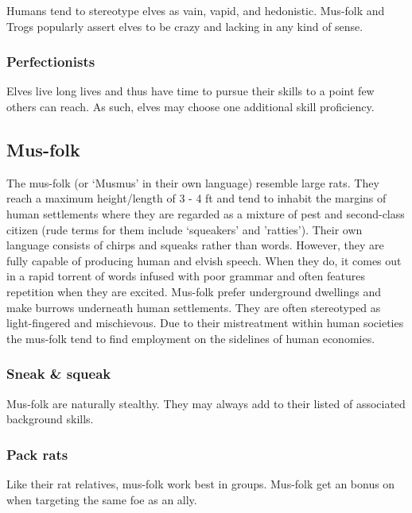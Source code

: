 \documentclass[a4paper,11pt,oneside]{book}
\newcommand{\textlf}[1]{\textbf{\titlecap{#1}}}
\begin{document}
Humans tend to stereotype elves as vain, vapid, and hedonistic. Mus-folk and Trogs popularly assert elves to be crazy and lacking in any kind of sense. 

\subsubsection*{Perfectionists}
Elves live long lives and thus have time to pursue their skills to a point few others can reach. As such, elves may choose one additional skill proficiency.


\subsection{Mus-folk}
The mus-folk (or `Musmus' in their own language) resemble large rats. They reach a maximum height/length of 3 - 4 ft and tend to inhabit the margins of human settlements where they are regarded as a mixture of pest and second-class citizen (rude terms for them include `squeakers' and 'ratties'). Their own language consists of chirps and squeaks rather than words. However, they are fully capable of producing human and elvish speech. When they do, it comes out in a rapid torrent of words infused with poor grammar and often features repetition when they are excited. Mus-folk prefer underground dwellings and make burrows underneath human settlements. They are often stereotyped as light-fingered and mischievous. Due to their mistreatment within human societies the mus-folk tend to find employment on the sidelines of human economies.    

\subsubsection*{Sneak \& squeak}
Mus-folk are naturally stealthy. They may always add \textlf{stealth} to their listed of associated background skills. 

\subsubsection*{Pack rats}
Like their rat relatives, mus-folk work best in groups. Mus-folk get an \textlf{edge} bonus on \textlf{aim} when targeting the same foe as an ally. 
\end{document}
